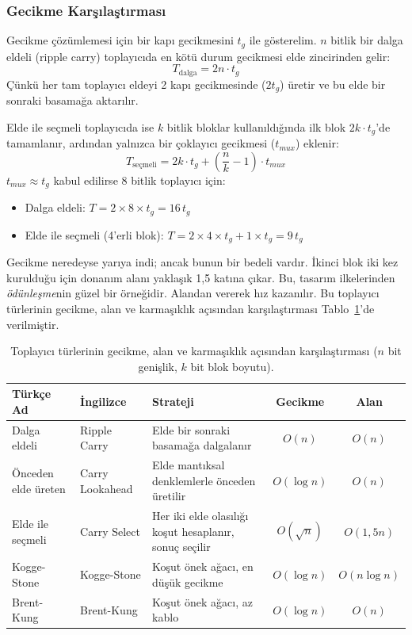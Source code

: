 \subsubsection*{Gecikme Karşılaştırması}

Gecikme çözümlemesi için bir kapı gecikmesini $t_g$ ile gösterelim. $n$ bitlik bir dalga eldeli (ripple carry) toplayıcıda en kötü durum gecikmesi elde zincirinden gelir:
\[
T_{\text{dalga}} = 2n \cdot t_g
\]
Çünkü her tam toplayıcı eldeyi 2 kapı gecikmesinde ($2t_g$) üretir ve bu elde bir sonraki basamağa aktarılır.

Elde ile seçmeli toplayıcıda ise $k$ bitlik bloklar kullanıldığında ilk blok $2k \cdot t_g$'de tamamlanır, ardından yalnızca bir çoklayıcı gecikmesi ($t_{mux}$) eklenir:
\[
T_{\text{seçmeli}} = 2k \cdot t_g + \left(\frac{n}{k} - 1\right) \cdot t_{mux}
\]
$t_{mux} \approx t_g$ kabul edilirse 8 bitlik toplayıcı için:
\begin{itemize}
  \item Dalga eldeli: $T = 2 \times 8 \times t_g = 16\,t_g$
  \item Elde ile seçmeli (4'erli blok): $T = 2 \times 4 \times t_g + 1 \times t_g = 9\,t_g$
\end{itemize}
Gecikme neredeyse yarıya indi; ancak bunun bir bedeli vardır. İkinci blok iki kez kurulduğu için donanım alanı yaklaşık 1{,}5 katına çıkar. Bu, tasarım ilkelerinden \emph{ödünleşme}nin güzel bir örneğidir. Alandan vererek hız kazanılır. Bu toplayıcı türlerinin gecikme, alan ve karmaşıklık açısından karşılaştırması Tablo~\ref{tab:toplayici-karsilastirma}'de verilmiştir.

\begin{table}[htbp]
\centering
\caption[Toplayıcı türlerinin karşılaştırması]{Toplayıcı türlerinin gecikme, alan ve karmaşıklık açısından karşılaştırması ($n$ bit genişlik, $k$ bit blok boyutu).}
\label{tab:toplayici-karsilastirma}
\small
\begin{tabularx}{\textwidth}{l l X c c}
\toprule
\textbf{Türkçe Ad} & \textbf{İngilizce} & \textbf{Strateji} & \textbf{Gecikme} & \textbf{Alan} \\
\midrule
Dalga eldeli & Ripple Carry & Elde bir sonraki basamağa dalgalanır & $O(n)$ & $O(n)$ \\
Önceden elde üreten & Carry Lookahead & Elde mantıksal denklemlerle önceden üretilir & $O(\log n)$ & $O(n)$ \\
Elde ile seçmeli & Carry Select & Her iki elde olasılığı koşut hesaplanır, sonuç seçilir & $O(\sqrt{n})$ & $O(1{,}5n)$ \\
Kogge-Stone & Kogge-Stone & Koşut önek ağacı, en düşük gecikme & $O(\log n)$ & $O(n \log n)$ \\
Brent-Kung & Brent-Kung & Koşut önek ağacı, az kablo & $O(\log n)$ & $O(n)$ \\
\bottomrule
\end{tabularx}
\end{table}

